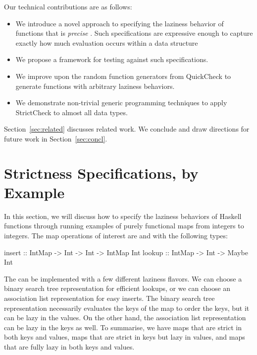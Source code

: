 \documentclass[acmsmall,review]{acmart}\settopmatter{}
\begin{document}
Our technical contributions are as follows:
\begin{itemize}
\item We introduce a novel approach to specifying the laziness behavior of functions that is
{\em precise} . Such specifications are
expressive enough to capture exactly how much evaluation occurs within
a data structure  
\item We propose a framework for testing against such specifications.
\item We improve upon the random function generators from QuickCheck to generate functions with arbitrary laziness behaviors.
\item We demonstrate non-trivial generic programming techniques to apply StrictCheck to almost all data types.
\end{itemize}
%
Section~\ref{sec:related} discusses related work. We conclude and draw
directions for future work in Section~\ref{sec:concl}.

\section{Strictness Specifications, by Example}
\label{sec:quickchick}

In this section, we will discuss how to specify the laziness behaviors
of Haskell functions through running examples of purely functional
maps from integers to integers. The map operations of interest
are  and  with the following types:
\begin{inlinecode}
insert :: IntMap -> Int -> Int -> IntMap Int
lookup :: IntMap -> Int        -> Maybe  Int
\end{inlinecode}
%
The  can be implemented with a few different laziness
flavors. We can choose a binary search tree representation for
efficient lookups, or we can choose an association list representation
for easy inserts. The binary search tree representation necessarily
evaluates the keys of the map to order the keys, but it can be lazy in
the values. On the other hand, the association list representation can
be lazy in the keys as well. To summarise, we have maps that are
strict in both keys and values, maps that are strict in keys but lazy
in values, and maps that are fully lazy in both keys and values.
\end{document}
